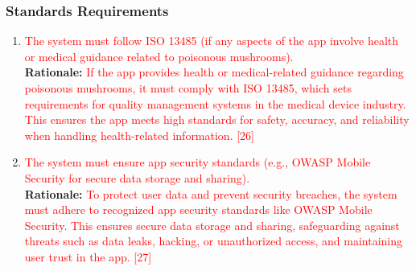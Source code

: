 \documentclass{article}
\begin{document}
\subsubsection{Standards Requirements}
\begin{enumerate}[{LR-STD}1. ]

	\item \textcolor{red}{The system must follow ISO 13485 (if any aspects of the app involve health or medical guidance related to poisonous mushrooms).}\\
	\textbf{Rationale:} \textcolor{red}{If the app provides health or medical-related guidance regarding poisonous mushrooms, it must comply with ISO 13485, which sets requirements for quality management systems in the medical device industry. This ensures the app meets high standards for safety, accuracy, and reliability when handling health-related information. [26]}\\

	\item \textcolor{red}{The system must ensure app security standards (e.g., OWASP Mobile Security for secure data storage and sharing).}\\
	\textbf{Rationale:} \textcolor{red}{To protect user data and prevent security breaches, the system must adhere to recognized app security standards like OWASP Mobile Security. This ensures secure data storage and sharing, safeguarding against threats such as data leaks, hacking, or unauthorized access, and maintaining user trust in the app. [27]}\\


\end{enumerate}
\end{document}

